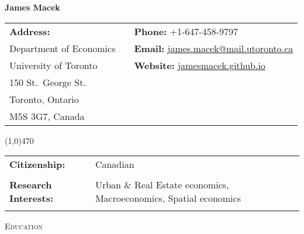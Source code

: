 \documentclass[11pt]{amsart}
\author{}
\begin{document}
\pagestyle{empty}
\setlength\parindent{0pt}

\Huge
\hspace*{\fill} \textbf{James Macek} \hspace*{\fill}
\normalsize
\vspace{1cm}

 \begin{tabular}{p{5cm} p{1cm} p{10cm}}
 \textbf{Address:}       &  & \textbf{Phone:} +1-647-458-9797                                                                                        \\
 Department of Economics &  & \textbf{Email:} \href{mailto:james.macek@mail.utoronto.ca}{james.macek@mail.utoronto.ca}                         \\
 University of Toronto   &  & \textbf{Website:} \href{https://jamesmacek.github.io}{jamesmacek.github.io}  \\
150 St.\ George St.       &  &                                                                                                                        \\
Toronto, Ontario         &  &                                                                                                                        \\
M5S 3G7, Canada          &  &                                                                                                                        
\end{tabular}

\line(1,0){470}


 \begin{tabular}{ p{4cm}  p{15cm}}
 \textbf{Citizenship:}           & Canadian                                     \\
                                 &                                              \\
\textbf{Research Interests:}     & Urban \& Real Estate economics, Macroeconomics,  Spatial economics  \\ 
                                 &                                           \\
\end{tabular}



\vspace{0.4cm}





\LARGE
\textsc{Education}
\vspace{0.2cm}
\end{document}
